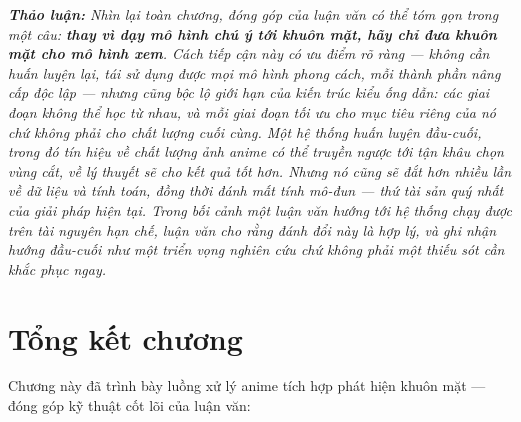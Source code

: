 \medskip
\noindent\textit{\textbf{Thảo luận:} Nhìn lại toàn chương, đóng góp của luận văn có thể tóm gọn trong một câu: \textbf{thay vì dạy mô hình chú ý tới khuôn mặt, hãy chỉ đưa khuôn mặt cho mô hình xem}. Cách tiếp cận này có ưu điểm rõ ràng --- không cần huấn luyện lại, tái sử dụng được mọi mô hình phong cách, mỗi thành phần nâng cấp độc lập --- nhưng cũng bộc lộ giới hạn của kiến trúc kiểu ống dẫn: các giai đoạn không thể học từ nhau, và mỗi giai đoạn tối ưu cho mục tiêu riêng của nó chứ không phải cho chất lượng cuối cùng. Một hệ thống huấn luyện đầu-cuối, trong đó tín hiệu về chất lượng ảnh anime có thể truyền ngược tới tận khâu chọn vùng cắt, về lý thuyết sẽ cho kết quả tốt hơn. Nhưng nó cũng sẽ đắt hơn nhiều lần về dữ liệu và tính toán, đồng thời đánh mất tính mô-đun --- thứ tài sản quý nhất của giải pháp hiện tại. Trong bối cảnh một luận văn hướng tới hệ thống chạy được trên tài nguyên hạn chế, luận văn cho rằng đánh đổi này là hợp lý, và ghi nhận hướng đầu-cuối như một triển vọng nghiên cứu chứ không phải một thiếu sót cần khắc phục ngay.}

\section*{Tổng kết chương}

Chương này đã trình bày luồng xử lý anime tích hợp phát hiện khuôn mặt --- đóng góp kỹ thuật cốt lõi của luận văn:


